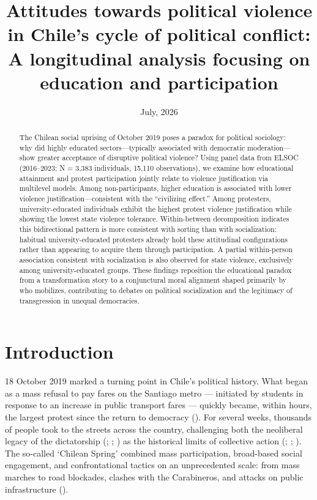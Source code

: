 \documentclass[
  13pt,
]{article}
\title{Attitudes towards political violence in Chile's cycle of
political conflict: A longitudinal analysis focusing on education and
participation}
\author{}
\date{July, 2026}
\begin{document}
\maketitle
\begin{abstract}
The Chilean social uprising of October 2019 poses a paradox for
political sociology: why did highly educated sectors---typically
associated with democratic moderation---show greater acceptance of
disruptive political violence? Using panel data from ELSOC (2016--2023;
N = 3,383 individuals, 15,110 observations), we examine how educational
attainment and protest participation jointly relate to violence
justification via multilevel models. Among non-participants, higher
education is associated with lower violence justification---consistent
with the ``civilizing effect.'' Among protesters, university-educated
individuals exhibit the highest protest violence justification while
showing the lowest state violence tolerance. Within-between
decomposition indicates this bidirectional pattern is more consistent
with sorting than with socialization: habitual university-educated
protesters already hold these attitudinal configurations rather than
appearing to acquire them through participation. A partial within-person
association consistent with socialization is also observed for state
violence, exclusively among university-educated groups. These findings
reposition the educational paradox from a transformation story to a
conjunctural moral alignment shaped primarily by who mobilizes,
contributing to debates on political socialization and the legitimacy of
transgression in unequal democracies.
\end{abstract}


\section{Introduction}\label{introduction}

18 October 2019 marked a turning point in Chile's political history.
What began as a mass refusal to pay fares on the Santiago metro ---
initiated by students in response to an increase in public transport
fares --- quickly became, within hours, the largest protest since the
return to democracy ().
For several weeks, thousands of people took to the streets across the
country, challenging both the neoliberal legacy of the dictatorship
(;
;
) as the historical
limits of collective action (; ;
). The so-called
`Chilean Spring' combined mass participation, broad-based social
engagement, and confrontational tactics on an unprecedented scale: from
mass marches to road blockades, clashes with the Carabineros, and
attacks on public infrastructure
().
\end{document}

